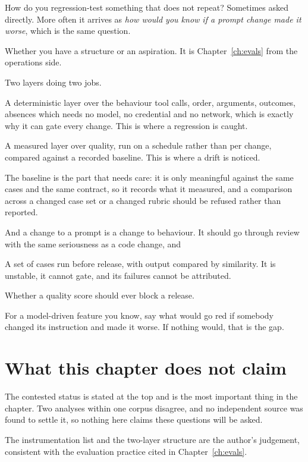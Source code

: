 \begin{bankq}{How do you regression-test something that does not repeat?}
\qasked
Sometimes asked directly. More often it arrives as \emph{how would you know if
a prompt change made it worse}, which is the same question.

\qtested
Whether you have a structure or an aspiration. It is Chapter~\ref{ch:evals}
from the operations side.

\qstaff
Two layers doing two jobs.

A deterministic layer over the behaviour \dash{} tool calls, order, arguments,
outcomes, absences \dash{} which needs no model, no credential and no network,
which is exactly why it can gate every change. This is where a regression is
caught.

A measured layer over quality, run on a schedule rather than per change,
compared against a recorded baseline. This is where a drift is noticed.

The baseline is the part that needs care: it is only meaningful against the
same cases and the same contract, so it records what it measured, and a
comparison across a changed case set or a changed rubric should be refused
rather than reported. 

And a change to a prompt is a change to behaviour. It should go through review
with the same seriousness as a code change, and 

\qsenior
A set of cases run before release, with output compared by similarity. It is
unstable, it cannot gate, and its failures cannot be attributed.

\qcontested
Whether a quality score should ever block a release.

\qdrill
For a model-driven feature you know, say what would go red if somebody changed
its instruction and made it worse. If nothing would, that is the gap.
\end{bankq}

\section*{What this chapter does not claim}

The contested status is stated at the top and is the most important thing in
the chapter. Two analyses within one corpus disagree, and no independent source
was found to settle it, so nothing here claims these questions will be asked.

The instrumentation list and the two-layer structure are the author's judgement,
consistent with the evaluation practice cited in Chapter~\ref{ch:evals}.
